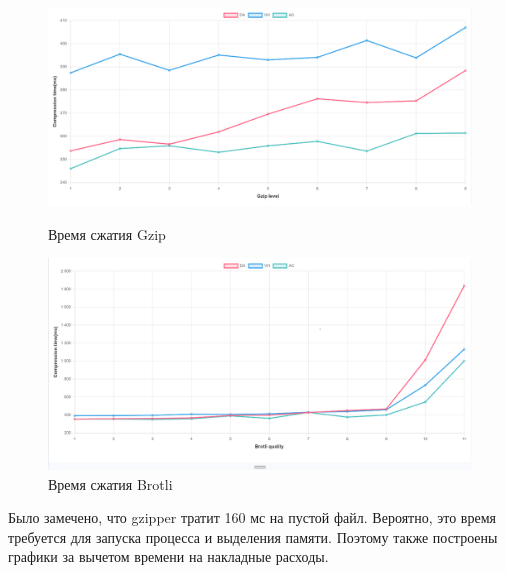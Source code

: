 \documentclass[12pt]{article}
\begin{document}
\begin{figure}[H]
    \centering
    \begin{minipage}{0.48\textwidth}
        \centering
        \includegraphics[width=\linewidth]{../images/Gzip compression time (Trimmed Mean).png}
        \caption{Время сжатия Gzip}
        \label{fig:image1}
    \end{minipage}
    \hfill
    \begin{minipage}{0.48\textwidth}
        \centering
        \includegraphics[width=\linewidth]{../images/Brotli compression time (Trimmed Mean).png}
        \caption{Время сжатия Brotli}
        \label{fig:image2}
    \end{minipage}
\end{figure}

Было замечено, что gzipper тратит 160 мс на пустой файл. Вероятно,
это время требуется для запуска процесса и выделения памяти. Поэтому также построены графики за вычетом времени на накладные расходы.
\end{document}
